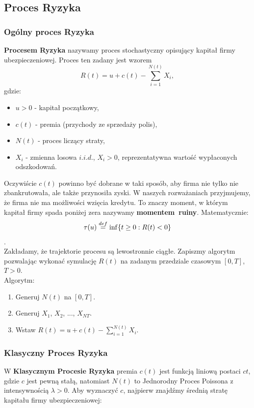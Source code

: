 \documentclass{article}
\theoremstyle{break}
\numberwithin{equation}{subsection}
\numberwithin{figure}{section}
\begin{document}
\subsection{Proces Ryzyka}
\subsubsection*{Ogólny proces Ryzyka}

\textbf{Procesem Ryzyka} nazywamy proces stochastyczny opisujący kapitał firmy ubezpieczeniowej. Proces ten zadany jest wzorem $$R(t) = u + c(t) - \sum_{i=1}^{N(t)}X_i,$$
gdzie:
\begin{itemize}
\item $u>0$ - kapitał początkowy,
\item $c(t)$ - premia (przychody ze sprzedaży polis),
\item $N(t)$ - proces liczący straty,
\item $X_i$ - zmienna losowa $i.i.d.$, $X_i>0$, reprezentatywna wartość wypłaconych odszkodowań.
\end{itemize}

Oczywiście $c(t)$ powinno być dobrane w taki sposób, aby firma nie tylko nie zbankrutowała, ale także przynosiła zyski. W naszych rozważaniach przyjmujemy, że firma nie ma możliwości wzięcia kredytu. To znaczy moment, w którym kapitał firmy spada poniżej zera nazywamy \textbf{momentem~ruiny}.
Matematycznie: $$\tau(u) \buildrel def \over = \inf\{t\ge 0: R(t) < 0\}$$.\\
Zakładamy, że trajektorie procesu są lewostronnie ciągłe.
Zapiszmy algorytm pozwalając wykonać symulację $R(t)$ na zadanym przedziale czasowym $[0, T]$, $T>0$.\\
Algorytm:
\begin{enumerate}
\item Generuj $N(t)$ na $[0, T]$.
\item Generuj $X_1$, $X_2$, ..., $X_{N{T}}$.
\item Wstaw $R(t) = u + c(t) - \sum_{i=1}^{N(t)}X_i$.
\end{enumerate}
\subsubsection*{Klasyczny Proces Ryzyka}
W \textbf{Klasycznym Procesie Ryzyka} premia $c(t)$ jest funkcją liniową postaci $ct$, gdzie $c$ jest pewną stałą, natomiast $N(t)$ to Jednorodny Proces Poissona z intensywnością $\lambda > 0$. Aby wyznaczyć $c$, najpierw znajdźmy średnią stratę kapitału firmy ubezpieczeniowej:
\end{document}
